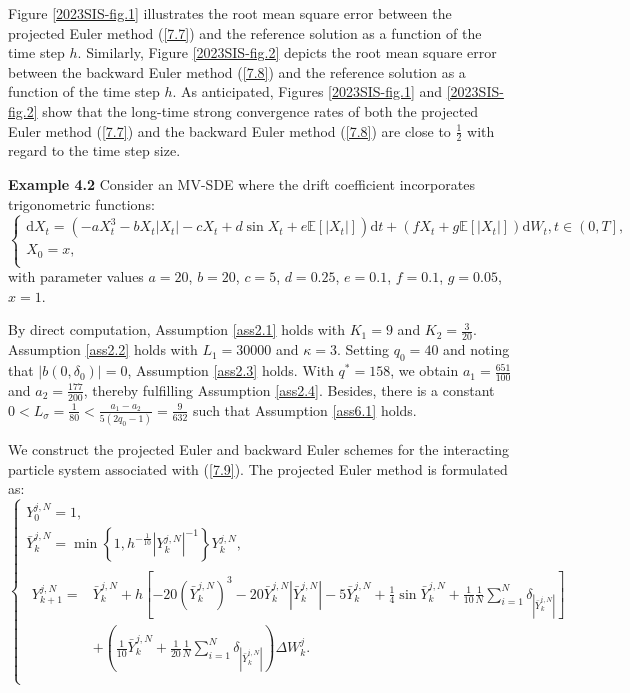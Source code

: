 \documentclass[12pt]{article}
\numberwithin{equation}{section}
\begin{document}
Figure \ref{2023SIS-fig.1} illustrates the root mean square error between the  projected Euler method (\ref{7.7}) and the reference solution  as a function of the time step $h$. Similarly, Figure \ref{2023SIS-fig.2} depicts the root mean square error between the backward Euler method (\ref{7.8}) and the reference solution  as a function of the time step $h$. As anticipated, Figures  \ref{2023SIS-fig.1} and \ref{2023SIS-fig.2} show that the long-time strong convergence rates of both the projected Euler method (\ref{7.7}) and the backward Euler method (\ref{7.8}) are close to $\tfrac{1}{2}$ with regard to the time step size.

\smallskip
\noindent \textbf{Example  4.2}  Consider an   MV-SDE where the drift coefficient incorporates trigonometric functions:
\begin{equation}\tag{4.9}\label{7.9}
\begin{cases}
	\mathrm{d}X_t=\left( -aX_{t}^{3}-bX_t\left| X_t \right|-cX_t+d\sin X_t+e\mathbb{E} \left[ \left| X_t \right| \right] \right) \mathrm{d}t+\left( fX_t+g\mathbb{E} \left[ \left| X_t \right| \right] \right) \mathrm{d}W_t,t\in \left( 0,T \right] ,\\
	X_0=x,\\
\end{cases}
\end{equation}
with parameter values $a=20$, $b=20$, $c=5$, $d=0.25$, $e=0.1$, $f=0.1$, $g=0.05$, $x=1$.

By direct computation, Assumption \ref{ass2.1} holds with $K_1=9$ and $K_2=\tfrac{3}{20}$. Assumption \ref{ass2.2} holds with $L_1=30000$ and $\kappa=3$. Setting $q_{0}=40$ and noting that $\left| b\left( 0,\delta _0 \right) \right|=0$, Assumption \ref{ass2.3} holds. With $q^*=158$, we obtain $a_1=\tfrac{651}{100}$ and $a_2=\tfrac{177}{200}$, thereby fulfilling Assumption \ref{ass2.4}. Besides, there is a constant $0<L_{\sigma}=\tfrac{1}{80}<\tfrac{a_1-a_2}{5\left( 2q_0-1 \right)}=\tfrac{9}{632}$ such that Assumption \ref{ass6.1} holds.

We construct the projected Euler and backward Euler schemes  for the interacting particle system  associated with (\ref{7.9}). The projected Euler method is formulated as:
\begin{equation}\tag{4.10}\label{7.10}
\left\{ \begin{array}{l}
	Y_{0}^{j,N}=1,\\
	\bar{Y}_{k}^{j,N}=\min \left\{ 1,h^{-\frac{1}{10}}\left| Y_{k}^{j,N} \right|^{-1} \right\} Y_{k}^{j,N},\\
	\begin{aligned}  Y_{k+1}^{j,N}=&\bar{Y}_{k}^{j,N}+h\left[ -20\left( \bar{Y}_{k}^{j,N} \right) ^3-20\bar{Y}_{k}^{j,N}\left| \bar{Y}_{k}^{j,N} \right|-5\bar{Y}_{k}^{j,N}+\tfrac{1}{4}\sin \bar{Y}_{k}^{j,N}+\tfrac{1}{10}\tfrac{1}{N}\sum_{i=1}^N{\delta _{\left| \bar{Y}_{k}^{i,N} \right|}} \right] \\
    &+\left( \tfrac{1}{10}\bar{Y}_{k}^{j,N}+\tfrac{1}{20}\tfrac{1}{N}\sum_{i=1}^N{\delta _{\left| \bar{Y}_{k}^{i,N} \right|}} \right) \Delta W_{k}^{j}.\\
	\end{aligned}
\end{array} \right. 
\end{equation}
\end{document}
